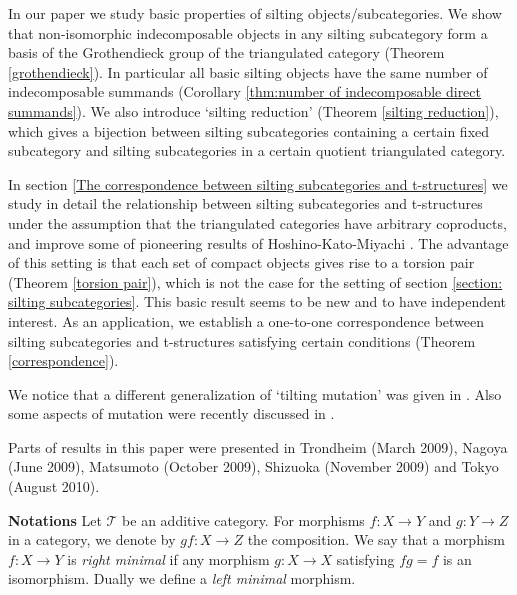 \documentclass[a4paper,reqno]{amsart}
\theoremstyle{definition}
\newcommand{\TT}{{\mathcal T}}
\begin{document}
In our paper we study basic properties of silting objects/subcategories.
We show that non-isomorphic indecomposable objects in any silting subcategory form a basis of the Grothendieck group of the triangulated category
(Theorem \ref{grothendieck}).
In particular all basic silting objects have the same number of indecomposable summands (Corollary \ref{thm:number of indecomposable direct summands}).
We also introduce `silting reduction' (Theorem \ref{silting reduction}), which gives a bijection between silting subcategories containing a certain fixed subcategory
and silting subcategories in a certain quotient triangulated category.

In section \ref{The correspondence between silting subcategories and t-structures}
we study in detail the relationship between silting subcategories and t-structures under the assumption that the triangulated categories have arbitrary coproducts,
and improve some of pioneering results of Hoshino-Kato-Miyachi \cite{HKM}.
The advantage of this setting is that each set of compact objects gives rise to a torsion pair (Theorem \ref{torsion pair}),
which is not the case for the setting of section \ref{section: silting subcategories}.
This basic result seems to be new and to have independent interest.
As an application, we establish a one-to-one correspondence between silting subcategories
and t-structures satisfying certain conditions (Theorem \ref{correspondence}).

We notice that a different generalization of `tilting mutation' was given in \cite{IO,HX}.
Also some aspects of mutation were recently discussed in \cite{BRT,L,KY}.

Parts of results in this paper were presented in Trondheim (March 2009),
Nagoya (June 2009), Matsumoto (October 2009), Shizuoka (November 2009) and Tokyo (August 2010).

\medskip
\noindent
{\bf Notations }
Let $\TT$ be an additive category.
For morphisms $f:X\to Y$ and $g:Y\to Z$ in a category, we denote by $gf:X\to Z$ the composition.
We say that a morphism $f:X\to Y$ is \emph{right minimal} if any morphism $g:X\to X$
satisfying $fg=f$ is an isomorphism. Dually we define a \emph{left minimal} morphism.
\end{document}
